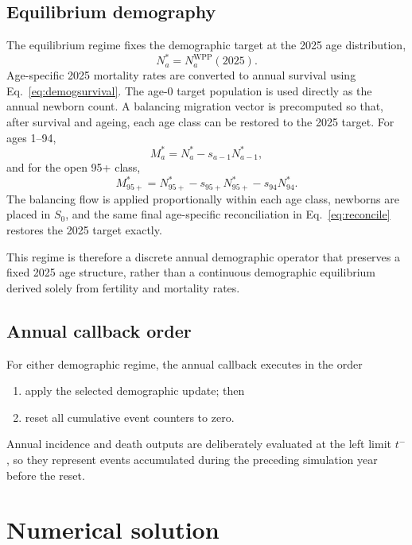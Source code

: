 \documentclass[11pt]{article}
\begin{document}
\subsection{Equilibrium demography}

The equilibrium regime fixes the demographic target at the 2025 age distribution,
\begin{equation}
N_a^*=N_a^{\mathrm{WPP}}(2025).
\end{equation}
Age-specific 2025 mortality rates are converted to annual survival using Eq.~\eqref{eq:demogsurvival}. The age-0 target population is used directly as the annual newborn count. A balancing migration vector is precomputed so that, after survival and ageing, each age class can be restored to the 2025 target. For ages 1--94,
\begin{equation}
M_a^*=N_a^*-s_{a-1}N_{a-1}^*,
\end{equation}
and for the open 95+ class,
\begin{equation}
M_{95+}^*=N_{95+}^*-s_{95+}N_{95+}^*-s_{94}N_{94}^*.
\end{equation}
The balancing flow is applied proportionally within each age class, newborns are placed in $S_0$, and the same final age-specific reconciliation in Eq.~\eqref{eq:reconcile} restores the 2025 target exactly.

This regime is therefore a discrete annual demographic operator that preserves a fixed 2025 age structure, rather than a continuous demographic equilibrium derived solely from fertility and mortality rates.

\subsection{Annual callback order}

For either demographic regime, the annual callback executes in the order
\begin{enumerate}[label=(\roman*)]
\item apply the selected demographic update; then
\item reset all cumulative event counters to zero.
\end{enumerate}
Annual incidence and death outputs are deliberately evaluated at the left limit $t^-$, so they represent events accumulated during the preceding simulation year before the reset.

\section{Numerical solution}
\end{document}
